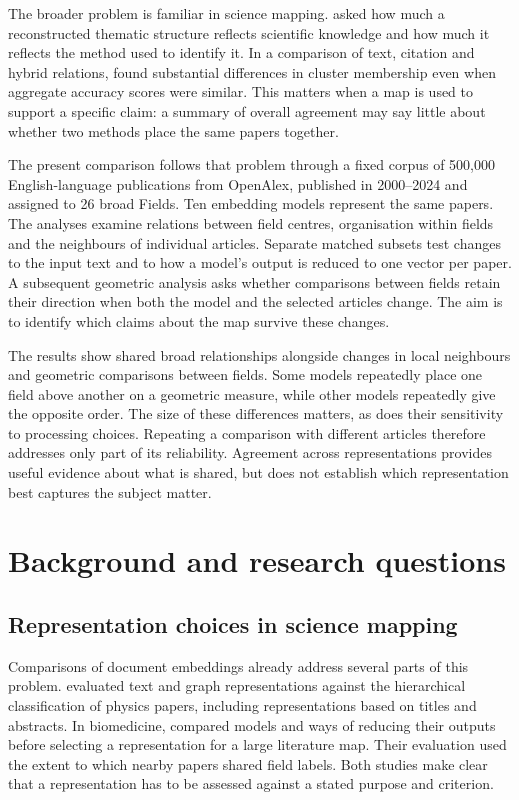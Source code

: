 \documentclass[12pt]{article}
\begin{document}
The broader problem is familiar in science mapping. \citet{refa0d2d707e6} asked how much a reconstructed thematic structure reflects scientific knowledge and how much it reflects the method used to identify it. In a comparison of text, citation and hybrid relations, \citet{ref6a2f5912bc} found substantial differences in cluster membership even when aggregate accuracy scores were similar. This matters when a map is used to support a specific claim: a summary of overall agreement may say little about whether two methods place the same papers together.

The present comparison follows that problem through a fixed corpus of 500,000 English-language publications from OpenAlex, published in 2000--2024 and assigned to 26 broad Fields. Ten embedding models represent the same papers. The analyses examine relations between field centres, organisation within fields and the neighbours of individual articles. Separate matched subsets test changes to the input text and to how a model's output is reduced to one vector per paper. A subsequent geometric analysis asks whether comparisons between fields retain their direction when both the model and the selected articles change. The aim is to identify which claims about the map survive these changes.

The results show shared broad relationships alongside changes in local neighbours and geometric comparisons between fields. Some models repeatedly place one field above another on a geometric measure, while other models repeatedly give the opposite order. The size of these differences matters, as does their sensitivity to processing choices. Repeating a comparison with different articles therefore addresses only part of its reliability. Agreement across representations provides useful evidence about what is shared, but does not establish which representation best captures the subject matter.

\section{Background and research questions}
\subsection{Representation choices in science mapping}
Comparisons of document embeddings already address several parts of this problem. \citet{refc0e2cc29e0} evaluated text and graph representations against the hierarchical classification of physics papers, including representations based on titles and abstracts. In biomedicine, \citet{refbe130e2973} compared models and ways of reducing their outputs before selecting a representation for a large literature map. Their evaluation used the extent to which nearby papers shared field labels. Both studies make clear that a representation has to be assessed against a stated purpose and criterion.
\end{document}
